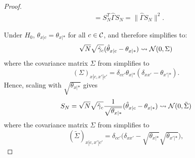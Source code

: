 \begin{proof}
\begin{equation*}
\begin{split}
    & = S_N^T \hat \Gamma S_N 
    = \lVert \hat\Gamma S_N \rVert^2.
  \end{split}\end{equation*}

  Under $H_0$, $\theta_{x|c} = \theta_{x|\ast}$ for all $c \in \mathcal{C}$, and therefore  simplifies to:
  \begin{equation*}
    \sqrt{N} \sqrt{\hat\gamma_c} (\hat\theta_{x|c} - \theta_{x|\ast}) \leadsto \mathcal{N}(0,\Sigma)
  \end{equation*}
  where the covariance matrix $\Sigma$ from  simplifies to
  \begin{equation*}
    (\Sigma)_{x|c,x'|c'} = \delta_{cc'} \theta_{x|\ast} (\delta_{xx'} - \theta_{x'|\ast}).
  \end{equation*}
  Hence, scaling with $\sqrt{\theta_{x|\ast}}$ gives
  \begin{equation*}
    S_N = \sqrt{N} \sqrt{\hat\gamma_c} \frac{1}{\sqrt{\theta_{x|\ast}}} (\hat\theta_{x|c} - \theta_{x|\ast}) \leadsto \mathcal{N}(0,\tilde{\Sigma})
  \end{equation*}
  where the covariance matrix $\Sigma$ from  simplifies to
  \begin{equation*}
    (\tilde{\Sigma})_{x|c,x'|c'} = \delta_{cc'} \Big(\delta_{xx'} - \sqrt{\theta_{x|\ast}} \sqrt{\theta_{x'|\ast}}\Big),

\end{equation*}
\end{proof}
